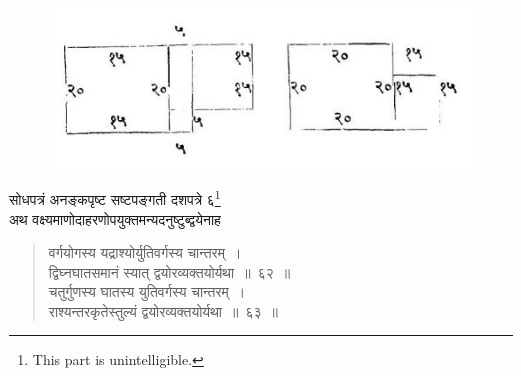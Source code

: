 \documentclass[11pt, openany]{book}
\begin{document}
\newpage
\begin{figure}[h!]
    \centering
    \includegraphics[scale=0.8]{Graphics/Capture9.JPG}
\end{figure}

\noindent सोधपत्रं अनङ्कपृष्ट सष्टपङ्गती दशपत्रे ६\footnote{This part is unintelligible.} \\

\vspace{-3mm}
 अथ वक्ष्यमाणोदाहरणोपयुक्तमन्यदनुष्टुब्द्वयेनाह\textendash 
\begin{quote}
    \bs
     वर्गयोगस्य यद्राश्योर्युतिवर्गस्य चान्तरम्~। \\
 द्विघ्नघातसमानं स्यात् द्वयोरव्यक्तयोर्यथा~॥~६२~॥\\

\vspace{-5mm}
 चतुर्गुणस्य घातस्य युतिवर्गस्य चान्तरम्~। \\
 राश्यन्तरकृतेस्तुल्यं द्वयोरव्यक्तयोर्यथा~॥~६३~॥
\end{quote}
\end{document}

